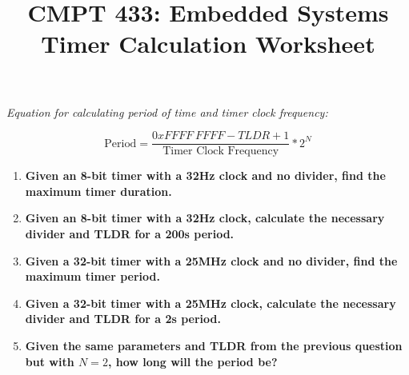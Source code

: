 \documentclass[10pt, oneside, letterpaper]{article}
\title{CMPT 433: Embedded Systems \\\medskip \Large Timer Calculation Worksheet}
\author{}
\date{}
\begin{document}
	\maketitle
	
	\textit{Equation for calculating period of time and timer clock frequency:}
	
	\begin{equation}
		\textrm{Period} = \frac{0xFFFF\ FFFF - TLDR + 1}{\textrm{Timer Clock Frequency}} * 2^N
	\end{equation}
		
	\vspace{1cm}

	\begin{enumerate}

		\item \textbf{Given an 8-bit timer with a 32Hz clock and no divider, find the maximum timer duration.}
		
		\vspace{6cm}
		
		

		\item \textbf{Given an 8-bit timer with a 32Hz clock, calculate the necessary divider and TLDR for a 200s period.}
		
		\vspace{6cm}
		\clearpage
		
		

		\item \textbf{Given a 32-bit timer with a 25MHz clock and no divider, find the maximum timer period.}
		
		\vspace{6cm}
		
		

		\item \textbf{Given a 32-bit timer with a 25MHz clock, calculate the necessary divider and TLDR for a 2s period.}
		
		\vspace{6cm}
		
		
		
		\item \textbf{Given the same parameters and TLDR from the previous question but with $N = 2$, how long will the period be?}

	\end{enumerate}
\end{document}
